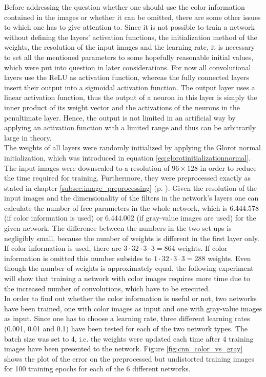 \documentclass[11pt, a4paper]{article}
\newcommand\myref[1]{\ref{#1} (p. \pageref{#1})}
\begin{document}
Before addressing the question whether one should use the color information contained in the images or whether it can be omitted, there are some other issues to which one has to give attention to. Since it is not possible to train a network without defining the layers' activation functions, the initialization method of the weights, the resolution of the input images and the learning rate, it is necessary to set all the mentioned parameters to some hopefully reasonable initial values, which were put into question in later considerations. For now all convolutional layers use the \ac{ReLU} as activation function, whereas the fully connected layers insert their output into a sigmoidal activation function. The output layer uses a linear activation function, thus the output of a neuron in this layer is simply the inner product of its weight vector and the activations of the neurons in the penultimate layer. Hence, the output is not limited in an artificial way by applying an activation function with a limited range and thus can be arbitrarily large in theory.\\
The weights of all layers were randomly initialized by applying the Glorot normal initialization, which was introduced in equation \eqref{eq:glorotinitializationnormal}. The input images were downscaled to a resolution of $96\times128$ in order to reduce the time required for training. Furthermore, they were preprocessed exactly as stated in chapter \myref{subsec:image_preprocessing}. Given the resolution of the input images and the dimensionality of the filters in the network's layers one can calculate the number of free parameters in the whole network, which is 6.444.578 (if color information is used) or 6.444.002 (if gray-value images are used) for the given network. The difference between the numbers in the two set-ups is negligibly small, because the number of weights is different in the first layer only. If color information is used, there are $3\cdot32\cdot3\cdot3 = 864$ weights. If color information is omitted this number subsides to $1\cdot32\cdot3\cdot3 = 288$ weights. Even though the number of weights is approximately equal, the following experiment will show that training a network with color images requires more time due to the increased number of convolutions, which have to be executed.\\
In order to find out whether the color information is useful or not, two networks have been trained, one with color images as input and one with gray-value images as input. Since one has to choose a learning rate, three different learning rates (0.001, 0.01 and 0.1) have been tested for each of the two network types. The batch size was set to 4, i.e. the weights were updated each time after 4 training images have been presented to the network. Figure \ref{fig:cnn_color_vs_gray} shows the plot of the error on the preprocessed but undistorted training images for 100 training epochs for each of the 6 different networks.
\end{document}
